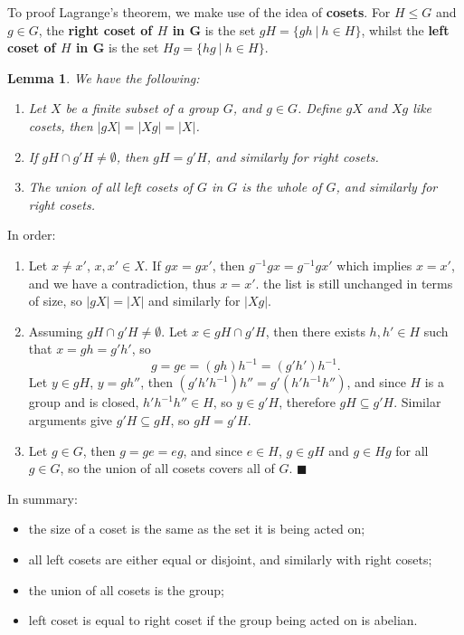 \documentclass[letter-paper]{tufte-book}
\newtheorem{lemma}[theorem]{\color{pastel-blue}Lemma}
\newenvironment{proof}[1][Proof]{\begin{trivlist}
\item[\hskip \labelsep {\bfseries #1}]}{\end{trivlist}}
\newcommand\Def[1]{\textbf{#1}}
\newcommand{\qed}{\hfill$\blacksquare$}
\begin{document}
To proof Lagrange's theorem, we make use of the idea of \Def{cosets}. For
$H\leq G$ and $g\in G$, the \Def{right coset of $H$ in G} is the
set $gH=\{gh\ |\ h\in H\}$, whilst the \Def{left coset of $H$ in G}
is the set $Hg=\{hg\ |\ h\in H\}$.
\begin{lemma}
  We have the following:
  \begin{enumerate}
    \item Let $X$ be a finite subset of a group $G$, and $g\in G$. Define $gX$ 
    and $Xg$ like cosets, then $|gX|=|Xg|=|X|$.
    \item If $gH\cap g'H\neq\emptyset$, then $gH=g'H$, and similarly for right 
    cosets.
    \item The union of all left cosets of $G$ in $G$ is the whole of $G$, and 
    similarly for right cosets.
  \end{enumerate}
\end{lemma}
\begin{proof}
  In order:
  \begin{enumerate}
    \item Let $x\neq x'$, $x,x'\in X$. If $gx=gx'$, then $g^{-1}gx=g^{-1}gx'$ 
    which implies $x=x'$, and we have a contradiction, thus $x=x'$. the list is 
    still unchanged in terms of size, so $|gX|=|X|$ and similarly for $|Xg|$.
    \item Assuming $gH\cap g'H\neq\emptyset$. Let $x\in gH\cap g'H$, then there 
    exists $h,h'\in H$ such that $x=gh=g'h'$, so
    \begin{equation*}
      g=ge=(gh)h^{-1}=(g'h')h^{-1}.
    \end{equation*}
    Let $y\in gH$, $y=gh''$, then $(g'h'h^{-1})h''=g'(h'h^{-1}h'')$, and since 
    $H$ is a group and is closed, $h'h^{-1}h''\in H$, so $y\in g'H$, therefore 
    $gH\subseteq g'H$. Similar arguments give $g'H\subseteq gH$, so $gH=g'H$.
    \item Let $g\in G$, then $g=ge=eg$, and since $e\in H$, $g\in gH$ and 
    $g\in Hg$ for all $g\in G$, so the union of all cosets covers all of $G$. \qed
  \end{enumerate}
\end{proof}

In summary:
\begin{itemize}
  \item the size of a coset is the same as the set it is being acted on;
  \item all left cosets are either equal or disjoint, and similarly with right 
  cosets;
  \item the union of all cosets is the group;
  \item left coset is equal to right coset if the group being acted on is 
  abelian.
\end{itemize}
\end{document}
